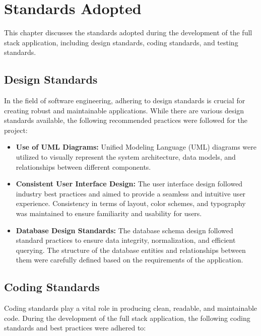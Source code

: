 \chapter{Standards Adopted}

This chapter discusses the standards adopted during the development of the full stack application, including design standards, coding standards, and testing standards.

\section{Design Standards}
In the field of software engineering, adhering to design standards is crucial for creating robust and maintainable applications. While there are various design standards available, the following recommended practices were followed for the project:

\begin{itemize}
	\item \textbf{Use of UML Diagrams: } Unified Modeling Language (UML) diagrams were utilized to visually represent the system architecture, data models, and relationships between different components.
	\item \textbf{Consistent User Interface Design: } The user interface design followed industry best practices and aimed to provide a seamless and intuitive user experience. Consistency in terms of layout, color schemes, and typography was maintained to ensure familiarity and usability for users.
	\item \textbf{Database Design Standards: } The database schema design followed standard practices to ensure data integrity, normalization, and efficient querying. The structure of the database entities and relationships between them were carefully defined based on the requirements of the application.
\end{itemize}

\section{Coding Standards}
Coding standards play a vital role in producing clean, readable, and maintainable code. During the development of the full stack application, the following coding standards and best practices were adhered to:

